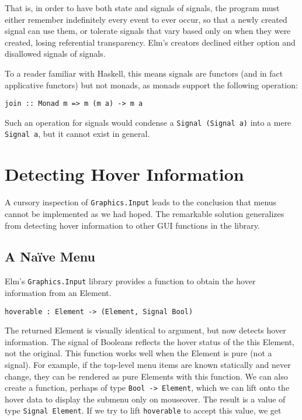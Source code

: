 \documentclass{article}
\begin{document}
That is, in order to have both state and signals of signals, the program
must either remember indefinitely every event to ever occur, so that a
newly created signal can use them, or tolerate signals that vary based
only on when they were created, losing referential transparency. Elm's
creators declined either option and disallowed signals of signals.

To a reader familiar with Haskell, this means signals are functors (and
in fact applicative functors) but not monads, as monads support the
following operation:

\begin{verbatim}
join :: Monad m => m (m a) -> m a
\end{verbatim}

Such an operation for signals would condense a
\texttt{Signal (Signal a)} into a mere \texttt{Signal a}, but it cannot
exist in general.

\section{Detecting Hover Information}\label{detecting-hover-information}
A cursory inspection of \texttt{Graphics.Input} leads to the conclusion that
menus cannot be implemented as we had hoped. The remarkable solution generalizes
from detecting hover information to other GUI functions in the library.

\subsection{A Na\"{i}ve Menu}\label{a-naive-menu}

Elm's \texttt{Graphics.Input} library provides a function to obtain the hover
information from an Element.

\texttt{hoverable : Element -\textgreater{} (Element, Signal Bool)}

The returned Element is visually identical to argument, but now detects
hover information. The signal of Booleans reflects the hover status of
the this Element, not the original. This function works well when the
Element is pure (not a signal). For example, if the top-level menu items are
known statically and never change, they can be rendered as pure Elements with
this function. We can also create a function, perhaps of type \texttt{Bool ->
Element}, which we can lift onto the hover data to display the submenu only on
mouseover. The result is a value of type \texttt{Signal Element}. If we try to
lift \texttt{hoverable} to accept this value, we get
\end{document}
